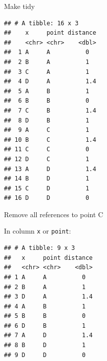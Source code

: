 \documentclass[ignorenonframetext,]{beamer}
\newenvironment{Shaded}{\begin{snugshade}}{\end{snugshade}}
\newcommand{\DecValTok}[1]{\textcolor[rgb]{0.00,0.00,0.81}{#1}}
\newcommand{\KeywordTok}[1]{\textcolor[rgb]{0.13,0.29,0.53}{\textbf{#1}}}
\newcommand{\NormalTok}[1]{#1}
\newcommand{\OperatorTok}[1]{\textcolor[rgb]{0.81,0.36,0.00}{\textbf{#1}}}
\newcommand{\StringTok}[1]{\textcolor[rgb]{0.31,0.60,0.02}{#1}}
\begin{document}
\begin{frame}[fragile]{Make tidy}
\protect\hypertarget{make-tidy}{}

\scriptsize

\begin{Shaded}
\end{Shaded}

\begin{verbatim}
## # A tibble: 16 x 3
##    x     point distance
##    <chr> <chr>    <dbl>
##  1 A     A          0  
##  2 B     A          1  
##  3 C     A          1  
##  4 D     A          1.4
##  5 A     B          1  
##  6 B     B          0  
##  7 C     B          1.4
##  8 D     B          1  
##  9 A     C          1  
## 10 B     C          1.4
## 11 C     C          0  
## 12 D     C          1  
## 13 A     D          1.4
## 14 B     D          1  
## 15 C     D          1  
## 16 D     D          0
\end{verbatim}

\normalsize

\end{frame}

\begin{frame}[fragile]{Remove all references to point C}
\protect\hypertarget{remove-all-references-to-point-c}{}

In column \texttt{x} or \texttt{point}:

\small

\begin{Shaded}
\end{Shaded}

\begin{verbatim}
## # A tibble: 9 x 3
##   x     point distance
##   <chr> <chr>    <dbl>
## 1 A     A          0  
## 2 B     A          1  
## 3 D     A          1.4
## 4 A     B          1  
## 5 B     B          0  
## 6 D     B          1  
## 7 A     D          1.4
## 8 B     D          1  
## 9 D     D          0
\end{verbatim}

\normalsize

\end{frame}
\end{document}
